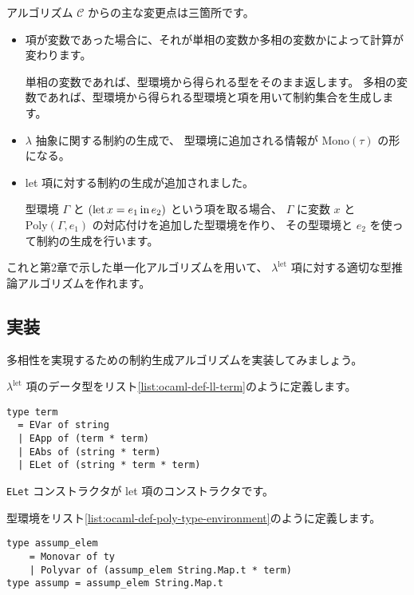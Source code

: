 アルゴリズム $\mathcal C$ からの主な変更点は三箇所です。

\begin{itemize}
  \item 項が変数であった場合に、それが単相の変数か多相の変数かによって計算が変わります。

        単相の変数であれば、型環境から得られる型をそのまま返します。
        多相の変数であれば、型環境から得られる型環境と項を用いて制約集合を生成します。

  \item $\lambda$ 抽象に関する制約の生成で、
        型環境に追加される情報が $\mathrm{Mono}(\tau)$ の形になる。

  \item let 項に対する制約の生成が追加されました。

        型環境 $\Gamma$ と $(\mathrm{let} \, x = e_1 \, \mathrm{in} \, e_2)$ という項を取る場合、
        $\Gamma$ に変数 $x$ と $\mathrm{Poly}(\Gamma, e_1)$ の対応付けを追加した型環境を作り、
        その型環境と $e_2$ を使って制約の生成を行います。
\end{itemize}

これと第2章で示した単一化アルゴリズムを用いて、
$\lambda^\mathrm{let}$ 項に対する適切な型推論アルゴリズムを作れます。

\subsection{実装}

多相性を実現するための制約生成アルゴリズムを実装してみましょう。

$\lambda^\mathrm{let}$ 項のデータ型をリスト\ref{list:ocaml-def-ll-term}のように定義します。

\begin{lstlisting}[caption=$\lambda^\mathrm{let}$ 項の定義, label=list:ocaml-def-ll-term]
type term
  = EVar of string
  | EApp of (term * term)
  | EAbs of (string * term)
  | ELet of (string * term * term)
\end{lstlisting}

\texttt{ELet} コンストラクタが let 項のコンストラクタです。

型環境をリスト\ref{list:ocaml-def-poly-type-environment}のように定義します。

\begin{lstlisting}[caption=型環境の定義, label=list:ocaml-def-poly-type-environment]
type assump_elem
    = Monovar of ty
    | Polyvar of (assump_elem String.Map.t * term)
type assump = assump_elem String.Map.t
\end{lstlisting}

